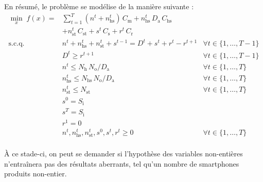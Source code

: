 En résumé, le problème se modélise de la manière suivante :
\begin{align*}
    \min_{x}\;f(x) =& \sum_{t=1}^{T}
    (n^t + n_\mathrm{hs}^t)\,C_\mathrm{m} 
    + n_\mathrm{hs}^t\,D_\mathrm{a}\,C_\mathrm{hs} \\
    &+ n_\mathrm{st}^t\,C_\mathrm{st}
    + s^t\,C_\mathrm{s}
    + r^t\,C_\mathrm{r} \\[0.5em]
%
    \mathrm{s.c.q.}\;\phantom{f(x) =}
    & n^t + n_\mathrm{hs}^t + n_\mathrm{st}^t + s^{t-1} = D^t + s^t + r^t - r^{t+1} & \forall t \in \{1,\dots,T-1\} \\
    & D^t \geq r^{t+1} & \forall t \in \{1,\dots,T-1\} \\
    & n^t \leq N_\mathrm{h}\,N_\mathrm{o}/D_\mathrm{a} & \forall t \in \{1,\dots,T\} \\
    & n_\mathrm{hs}^t \leq N_\mathrm{hs}\,N_\mathrm{o}/D_\mathrm{a} & \forall t \in \{1,\dots,T\} \\
    & n_\mathrm{st}^t \leq N_\mathrm{st} & \forall t \in \{1,\dots,T\} \\
    & s^0 = S_\mathrm{i} \\
    & s^T = S_\mathrm{i} \\
    & r^1 = 0 \\
    & n^t, n_\mathrm{hs}^t, n_\mathrm{st}^t, s^0, s^t, r^t \geq 0 & \forall t \in \{1,\dots,T\} \\
\end{align*}

À ce stade-ci, on peut se demander si l'hypothèse des variables non-entières n'entraînera pas des résultats aberrants, tel qu'un nombre de smartphones produits non-entier.
